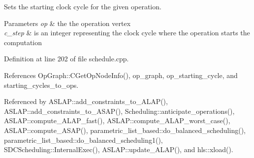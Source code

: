 Sets the starting clock cycle for the given operation. 


\begin{DoxyParams}{Parameters}
{\em op} & the the operation vertex \\
\hline
{\em c\+\_\+step} & is an integer representing the clock cycle where the operation starts the computation \\
\hline
\end{DoxyParams}


Definition at line 202 of file schedule.\+cpp.



References Op\+Graph\+::\+C\+Get\+Op\+Node\+Info(), op\+\_\+graph, op\+\_\+starting\+\_\+cycle, and starting\+\_\+cycles\+\_\+to\+\_\+ops.



Referenced by A\+S\+L\+A\+P\+::add\+\_\+constraints\+\_\+to\+\_\+\+A\+L\+A\+P(), A\+S\+L\+A\+P\+::add\+\_\+constraints\+\_\+to\+\_\+\+A\+S\+A\+P(), Scheduling\+::anticipate\+\_\+operations(), A\+S\+L\+A\+P\+::compute\+\_\+\+A\+L\+A\+P\+\_\+fast(), A\+S\+L\+A\+P\+::compute\+\_\+\+A\+L\+A\+P\+\_\+worst\+\_\+case(), A\+S\+L\+A\+P\+::compute\+\_\+\+A\+S\+A\+P(), parametric\+\_\+list\+\_\+based\+::do\+\_\+balanced\+\_\+scheduling(), parametric\+\_\+list\+\_\+based\+::do\+\_\+balanced\+\_\+scheduling1(), S\+D\+C\+Scheduling\+::\+Internal\+Exec(), A\+S\+L\+A\+P\+::update\+\_\+\+A\+L\+A\+P(), and hls\+::xload().

